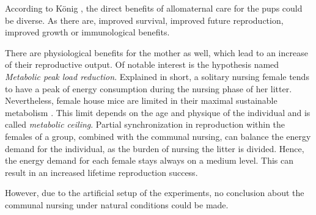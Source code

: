 According to K\"onig \cite{koenig:06}, the direct benefits of allomaternal care for the pups could be diverse. As there are, improved survival, improved future reproduction, improved growth or immunological benefits.

There are physiological benefits for the mother as well, which lead to an increase of their reproductive output. Of notable interest is the hypothesis named \textit{Metabolic peak load reduction}. Explained in short, a solitary nursing female tends to have a peak of energy consumption during the nursing phase of her litter. Nevertheless, female house mice are limited in their maximal sustainable metabolism \cite{hammond:92}. This limit depends on the age and physique of the individual and is called \textit{metabolic ceiling}. Partial synchronization in reproduction within the females of a group, combined with the communal nursing, can balance the energy demand for the individual, as the burden of nursing the litter is divided. Hence, the energy demand for each female stays always on a medium level\cite{koenig:06}. This can result in an increased lifetime reproduction success.

However, due to the artificial setup of the experiments, no conclusion about the communal nursing under natural conditions could be made.
